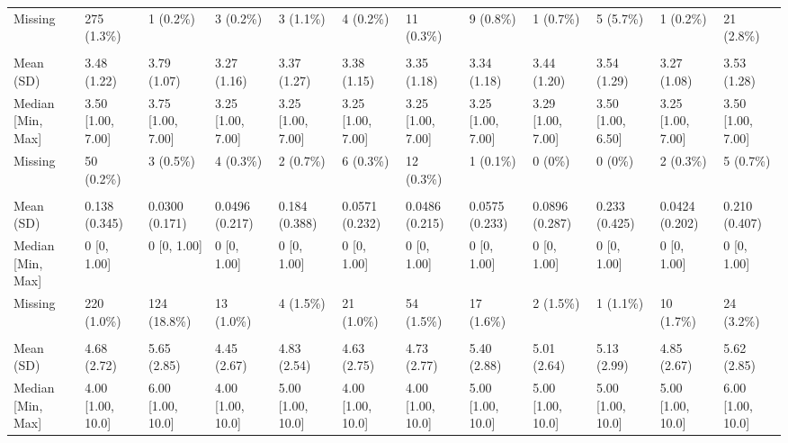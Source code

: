 \documentclass[
  single column]{article}
\begin{document}
\begin{landscape}
\begin{longtable}[t]{llllllllllll}
\hspace{1em}Missing & 275 (1.3\%) & 1 (0.2\%) & 3 (0.2\%) & 3 (1.1\%) & 4 (0.2\%) & 11 (0.3\%) & 9 (0.8\%) & 1 (0.7\%) & 5 (5.7\%) & 1 (0.2\%) & 21 (2.8\%)\\
\addlinespace[0.3em]
\multicolumn{12}{l}{\textbf{Neuroticism (Personality Trait)}}\\
\hspace{1em}Mean (SD) & 3.48 (1.22) & 3.79 (1.07) & 3.27 (1.16) & 3.37 (1.27) & 3.38 (1.15) & 3.35 (1.18) & 3.34 (1.18) & 3.44 (1.20) & 3.54 (1.29) & 3.27 (1.08) & 3.53 (1.28)\\
\hspace{1em}Median [Min, Max] & 3.50 [1.00, 7.00] & 3.75 [1.00, 7.00] & 3.25 [1.00, 7.00] & 3.25 [1.00, 7.00] & 3.25 [1.00, 7.00] & 3.25 [1.00, 7.00] & 3.25 [1.00, 7.00] & 3.29 [1.00, 7.00] & 3.50 [1.00, 6.50] & 3.25 [1.00, 7.00] & 3.50 [1.00, 7.00]\\
\hspace{1em}Missing & 50 (0.2\%) & 3 (0.5\%) & 4 (0.3\%) & 2 (0.7\%) & 6 (0.3\%) & 12 (0.3\%) & 1 (0.1\%) & 0 (0\%) & 0 (0\%) & 2 (0.3\%) & 5 (0.7\%)\\
\addlinespace[0.3em]
\multicolumn{12}{l}{\textbf{Non-Heterosexual Orientation (Yes/No)}}\\
\hspace{1em}Mean (SD) & 0.138 (0.345) & 0.0300 (0.171) & 0.0496 (0.217) & 0.184 (0.388) & 0.0571 (0.232) & 0.0486 (0.215) & 0.0575 (0.233) & 0.0896 (0.287) & 0.233 (0.425) & 0.0424 (0.202) & 0.210 (0.407)\\
\hspace{1em}Median [Min, Max] & 0 [0, 1.00] & 0 [0, 1.00] & 0 [0, 1.00] & 0 [0, 1.00] & 0 [0, 1.00] & 0 [0, 1.00] & 0 [0, 1.00] & 0 [0, 1.00] & 0 [0, 1.00] & 0 [0, 1.00] & 0 [0, 1.00]\\
\hspace{1em}Missing & 220 (1.0\%) & 124 (18.8\%) & 13 (1.0\%) & 4 (1.5\%) & 21 (1.0\%) & 54 (1.5\%) & 17 (1.6\%) & 2 (1.5\%) & 1 (1.1\%) & 10 (1.7\%) & 24 (3.2\%)\\
\addlinespace[0.3em]
\multicolumn{12}{l}{\textbf{New Zealand Depression Index 2018}}\\
\hspace{1em}Mean (SD) & 4.68 (2.72) & 5.65 (2.85) & 4.45 (2.67) & 4.83 (2.54) & 4.63 (2.75) & 4.73 (2.77) & 5.40 (2.88) & 5.01 (2.64) & 5.13 (2.99) & 4.85 (2.67) & 5.62 (2.85)\\
\hspace{1em}Median [Min, Max] & 4.00 [1.00, 10.0] & 6.00 [1.00, 10.0] & 4.00 [1.00, 10.0] & 5.00 [1.00, 10.0] & 4.00 [1.00, 10.0] & 4.00 [1.00, 10.0] & 5.00 [1.00, 10.0] & 5.00 [1.00, 10.0] & 5.00 [1.00, 10.0] & 5.00 [1.00, 10.0] & 6.00 [1.00, 10.0]\\

\end{longtable}
\end{landscape}
\end{document}
